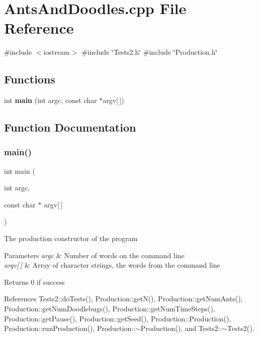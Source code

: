 \section{Ants\+And\+Doodles.\+cpp File Reference}
\label{AntsAndDoodles_8cpp}
{\ttfamily \#include $<$iostream$>$}\newline
{\ttfamily \#include \char`\"{}Tests2.\+h\char`\"{}}\newline
{\ttfamily \#include \char`\"{}Production.\+h\char`\"{}}\newline
\subsection*{Functions}
\begin{DoxyCompactItemize}
\item 
int \textbf{ main} (int argc, const char $\ast$argv[$\,$])
\end{DoxyCompactItemize}


\subsection{Function Documentation}
\mbox{\label{AntsAndDoodles_8cpp_ac0f2228420376f4db7e1274f2b41667c}} 
\subsubsection{main()}
{\footnotesize\ttfamily int main (\begin{DoxyParamCaption}\item[{int}]{argc,  }\item[{const char $\ast$}]{argv[$\,$] }\end{DoxyParamCaption})}

The production constructor of the program 
\begin{DoxyParams}{Parameters}
{\em argc} & Number of words on the command line \\
\hline
{\em argv\mbox{[}$\,$\mbox{]}} & Array of character strings, the words from the command line \\
\hline
\end{DoxyParams}
\begin{DoxyReturn}{Returns}
0 if success 
\end{DoxyReturn}


References Tests2\+::do\+Tests(), Production\+::get\+N(), Production\+::get\+Num\+Ants(), Production\+::get\+Num\+Doodlebugs(), Production\+::get\+Num\+Time\+Steps(), Production\+::get\+Pause(), Production\+::get\+Seed(), Production\+::\+Production(), Production\+::run\+Production(), Production\+::$\sim$\+Production(), and Tests2\+::$\sim$\+Tests2().


